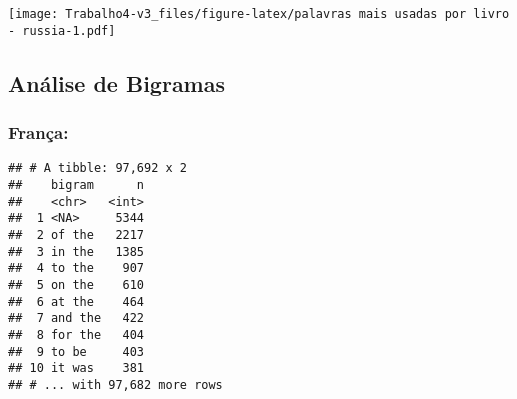 \documentclass[]{article}
\newenvironment{Shaded}{\begin{snugshade}}{\end{snugshade}}
\newcommand{\DataTypeTok}[1]{\textcolor[rgb]{0.13,0.29,0.53}{#1}}
\newcommand{\DecValTok}[1]{\textcolor[rgb]{0.00,0.00,0.81}{#1}}
\newcommand{\KeywordTok}[1]{\textcolor[rgb]{0.13,0.29,0.53}{\textbf{#1}}}
\newcommand{\NormalTok}[1]{#1}
\newcommand{\OperatorTok}[1]{\textcolor[rgb]{0.81,0.36,0.00}{\textbf{#1}}}
\newcommand{\OtherTok}[1]{\textcolor[rgb]{0.56,0.35,0.01}{#1}}
\newcommand{\StringTok}[1]{\textcolor[rgb]{0.31,0.60,0.02}{#1}}
\begin{document}
\texttt{[image: Trabalho4-v3\_files/figure-latex/palavras mais usadas por livro - russia-1.pdf]}

\hypertarget{analise-de-bigramas}{%
\subsection{Análise de Bigramas}\label{analise-de-bigramas}}

\hypertarget{franca-3}{%
\subsubsection{França:}\label{franca-3}}

\begin{Shaded}
\end{Shaded}

\begin{verbatim}
## # A tibble: 97,692 x 2
##    bigram      n
##    <chr>   <int>
##  1 <NA>     5344
##  2 of the   2217
##  3 in the   1385
##  4 to the    907
##  5 on the    610
##  6 at the    464
##  7 and the   422
##  8 for the   404
##  9 to be     403
## 10 it was    381
## # ... with 97,682 more rows
\end{verbatim}
\end{document}
